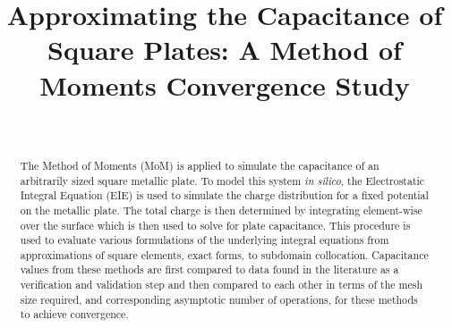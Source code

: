 \documentclass[journal]{IEEEtran}
\begin{document}
\title{Approximating the Capacitance of Square Plates: A Method of Moments Convergence Study}

\author{
\\
}

\maketitle

\begin{abstract}
The Method of Moments (MoM) is applied to simulate the capacitance of an arbitrarily sized square metallic plate. To model this system \textit{in silico}, the Electrostatic Integral Equation (EIE) is used to simulate the charge distribution for a fixed potential on the metallic plate. The total charge is then determined by integrating element-wise over the surface which is then used to solve for plate capacitance. This procedure is used to evaluate various formulations of the underlying integral equations from approximations of square elements, exact forms, to subdomain collocation. Capacitance values from these methods are first compared to data found in the literature as a verification and validation step and then compared to each other in terms of the mesh size required, and corresponding asymptotic number of operations, for these methods to achieve convergence.
\end{abstract}

\IEEEpeerreviewmaketitle

%




%




\end{document}
